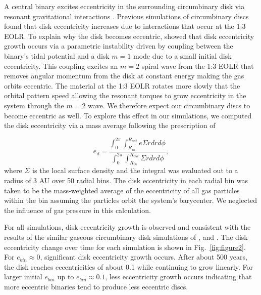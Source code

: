 A central binary excites eccentricity in the surrounding
circumbinary disk via resonant gravitational interactions
\citep{Papaloizou01,Artymowicz1996a}.  Previous simulations of circumbinary
discs \citep{Kley2008,Papaloizou01,PierensNelson07,PierensNelson13} found
that disk eccentricity increases due to interactions that occur at
the 1:3 EOLR.  To explain why the disk becomes eccentric, \citet{Papaloizou01} showed that disk eccentricity growth occurs via a parametric instability driven by coupling between the binary's tidal potential and a disk $m = 1$ mode due to a small initial disk eccentricity.  This coupling excites an $m = 2$ spiral wave from the 1:3 EOLR that removes angular momentum from the disk at constant energy making the gas orbits eccentric.  The material at the 1:3 EOLR rotates more slowly that the orbital pattern speed allowing the resonant torques to grow eccentricity in the system through the $m = 2$ wave.  We therefore expect our circumbinary discs to become eccentric as well.  To explore this effect in our simulations, we computed the disk eccentricity via a mass average following the prescription of \citet{PierensNelson07}

\begin{equation}
\bar{e}_d = \frac{\int_0^{2 \pi} \int^{R_{out}}_{R_{in}} e \Sigma r dr d\phi }{\int_0^{2 \pi} \int^{R_{out}}_{R_{in}} \Sigma r dr d\phi},
\end{equation}
where $\Sigma$ is the local surface density and the integral was
evaluated out to a radius of 3 AU over 50 radial bins.  The disk eccentricity in each radial bin was taken to be the mass-weighted average of the eccentricity of all gas particles within the bin assuming the particles orbit the system's barycenter.  We neglected the influence of gas pressure in this calculation.

For all simulations, disk eccentricity growth is observed and consistent with the results
of the similar gaseous circumbinary disk simulations of \citet{Kley2008}, \citet{PierensNelson07,PierensNelson13} and \citet{Farris2014}.  The disk eccentricity 
change over time for each simulation is shown in Fig.~\ref{fig:figure2}. For $e_{bin} \approx 0$, significant disk eccentricity growth occurs.  
After about 500 years, the disk reaches eccentricities of about 0.1 while continuing to grow linearly.  For larger initial $e_{bin}$ up 
to $e_{bin} \approx 0.1$, less eccentricity growth occurs indicating that more eccentric binaries tend to produce less eccentric discs.

